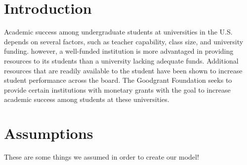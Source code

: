 \documentclass[paper.tex]{subfiles}
\begin{document}
	\section{Introduction}
	Academic success among undergraduate students at universities in the U.S. depends on several factors, such as teacher capability, class size, and university funding. however, a well-funded institution is more advantaged in providing resources to its students than a university lacking adequate funds. Additional resources that are readily available to the student have been shown to increase student performance across the board.\cite{greenwald1996effect} The Goodgrant Foundation seeks to provide certain institutions with monetary grants with the goal to increase academic success among students at these universities. 
	
	
	\section{Assumptions}
	These are some things we assumed in order to create our model!
\end{document}
